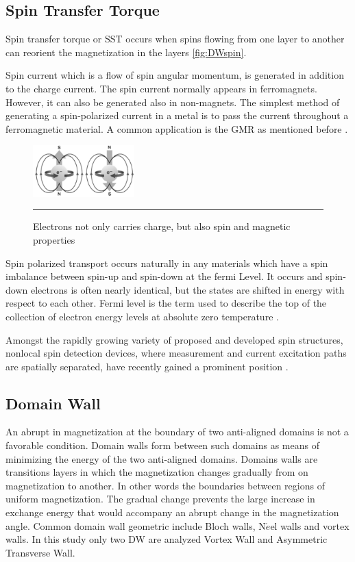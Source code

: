 \subsection{Spin Transfer Torque}


Spin transfer torque or SST occurs when spins flowing from one layer to another can reorient the magnetization in the layers \ref{fig:DWspin}.

Spin current which is a flow of spin angular momentum, is generated in addition to the charge current. The spin current normally appears in ferromagnets. However, it can also be generated also in non-magnets. The simplest method of generating a spin-polarized current in a metal is to pass the current throughout a ferromagnetic material. A common application is the GMR as mentioned before \cite{handbookspin}.

\begin{figure}[htbp]
	\centering
		\includegraphics[width=0.35\textwidth]{Figures/electron.png}
		\rule{35em}{0.5pt}
	\caption[Electron carries spin, charge and magnetic]{Electrons not only carries charge, but also spin and magnetic properties }
	\label{fig:electron}
\end{figure}


\cite{spintransfer}
 
Spin polarized transport occurs naturally in any materials which have a spin imbalance between spin-up and spin-down at the fermi Level. It occurs and spin-down electrons is often nearly identical, but the states are shifted in energy with respect to each other. Fermi level is the term used to describe the top of the collection of electron energy levels at absolute zero temperature \cite{handbookspin}.

Amongst the rapidly growing variety of proposed and developed spin structures, nonlocal spin detection devices, where measurement and current excitation paths are spatially separated, have recently gained a prominent position \cite{spinz}.

\subsection{Domain Wall}

An abrupt in magnetization at the boundary of two anti-aligned domains is not a favorable condition. Domain walls form between such domains as means of minimizing the energy of the two anti-aligned domains. Domains walls are transitions layers in which the magnetization changes gradually from on magnetization to another. In other words the boundaries between regions of uniform magnetization. The gradual change prevents the large increase in exchange energy that would accompany an abrupt change in the magnetization angle. Common domain wall geometric include Bloch walls, N$\acute{e}$el walls and vortex walls\cite{spindomain}. In this study only two DW are analyzed Vortex Wall and Asymmetric Transverse Wall.

